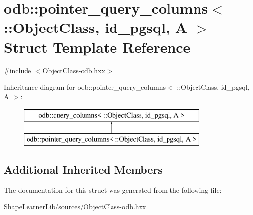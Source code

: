 \hypertarget{structodb_1_1pointer__query__columns_3_01_1_1_object_class_00_01id__pgsql_00_01_a_01_4}{}\section{odb\+:\+:pointer\+\_\+query\+\_\+columns$<$ \+:\+:Object\+Class, id\+\_\+pgsql, A $>$ Struct Template Reference}
\label{structodb_1_1pointer__query__columns_3_01_1_1_object_class_00_01id__pgsql_00_01_a_01_4}


{\ttfamily \#include $<$Object\+Class-\/odb.\+hxx$>$}

Inheritance diagram for odb\+:\+:pointer\+\_\+query\+\_\+columns$<$ \+:\+:Object\+Class, id\+\_\+pgsql, A $>$\+:\begin{figure}[H]
\begin{center}
\leavevmode
\includegraphics[height=2.000000cm]{da/d2a/structodb_1_1pointer__query__columns_3_01_1_1_object_class_00_01id__pgsql_00_01_a_01_4}
\end{center}
\end{figure}
\subsection*{Additional Inherited Members}


The documentation for this struct was generated from the following file\+:\begin{DoxyCompactItemize}
\item 
Shape\+Learner\+Lib/sources/\hyperlink{_object_class-odb_8hxx}{Object\+Class-\/odb.\+hxx}\end{DoxyCompactItemize}
